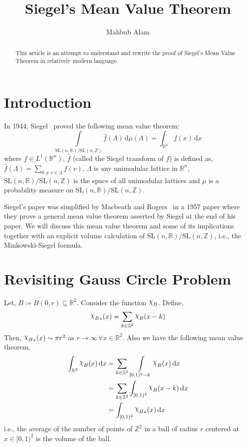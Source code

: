\documentclass[11pt]{article}
\theoremstyle{definition}
\newcommand{\mychi}{\raisebox{2pt}{$\chi$}}
\begin{document}
\title{\bfseries Siegel's Mean Value Theorem}

\author{Mahbub Alam}

\date{}

\maketitle

\begin{abstract}
    This article is an attempt to understand and rewrite the proof of Siegel's Mean Value Theorem in relatively modern language.
\end{abstract}

\section{Introduction}
In 1944, Siegel~\cite{siegel45} proved the following mean value theorem:
\[
    \int\limits_{\mathrm{SL}(n,\mathbb{R}) / \mathrm{SL}(n,\mathbb{Z})} \widehat{f}(\Lambda  ) \, \mathrm{d} \mu (\Lambda  ) = \int_{\mathbb{R}^n}f(x) \, \mathrm{d} x
\]
where $f\in L^1(\mathbb{R}^n )$, $\widehat{f}$ (called the Siegel transform of $f$) is defined as, $\widehat{f}( \Lambda ) = \displaystyle\sum_{0 \neq v \in \Lambda } f(v)$, $\Lambda$ is any unimodular lattice in $\mathbb{R}^{n}$, $\mathrm{SL}(n, \mathbb{R})/ \mathrm{SL}(n, \mathbb{Z})$ is the space of all unimodular lattices and $\mu$ is a probability measure on $\mathrm{SL}(n,\mathbb{R})/\mathrm{SL}(n,\mathbb{Z})$.

Siegel's paper was simplified by Macbeath and Rogers~\cite{macbeathrogers58} in a 1957 paper where they prove a general mean value theorem asserted by Siegel at the end of his paper.
We will discuss this mean value theorem and some of its implications together with an explicit volume calculation of $\mathrm{SL}(n,\mathbb{R})/\mathrm{SL}(n,\mathbb{Z})$, i.e., the Minkowski-Siegel formula.

\section{Revisiting Gauss Circle Problem}
Let, $B \coloneqq B(0, r) \subseteq \mathbb{R}^2$.
Consider the function $\mychi _B$.
Define,
\[
    {\mychi _B}_*(x) = \sum_{k \in \mathbb{Z}^2} \mychi _B(x-k)
\]
Then, ${\mychi _B}_*(x) \sim \pi r^2$ as $r \to \infty\, \forall x \in \mathbb{R}^2$.
Also we have the following mean value theorem,
\begin{align*}
    \int_{\mathbb{R}^2} \mychi _B (x)\, \mathrm{d} x &= \displaystyle\sum_{k \in \mathbb{Z}^2} \, \int\limits_{[0,1)^2 - k} \mychi _B (x) \, \mathrm{d} x\\
    &= \displaystyle\sum_{k \in \mathbb{Z}^2} \int_{[0,1)^2} \mychi _B (x-k) \, \mathrm{d} x\\
    &= \int_{[0,1)^2} {\mychi _B}_*(x) \, \mathrm{d} x
\end{align*}
i.e., the average of the number of points of $\mathbb{Z}^2$ in a ball of radius $r$ centered at $x \in [0,1)^2$ is the volume of the ball.
\end{document}
